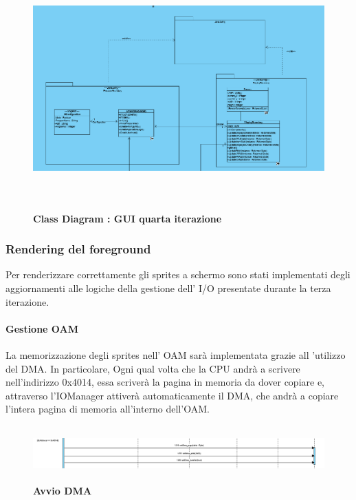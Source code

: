 \documentclass[11pt]{article}
\begin{document}
\begin{figure}[h]
\hspace*{-2.7cm}
\centering
\includegraphics[width=500px, height=350px]{CD_GUI_4.png}\\
\small\textbf{Class Diagram : GUI quarta iterazione}
\end{figure}

\subsubsection{Rendering del foreground}

Per renderizzare correttamente gli sprites a schermo sono stati implementati degli aggiornamenti alle logiche della gestione dell' I/O presentate durante la terza iterazione. 
\paragraph{Gestione OAM}
La memorizzazione degli sprites nell' OAM sarà implementata grazie all 'utilizzo del DMA. In particolare, Ogni qual volta che la CPU andrà a scrivere nell'indirizzo 0x4014, essa scriverà la pagina in memoria da dover copiare e, attraverso l'IOManager attiverà automaticamente il DMA, che andrà a copiare l'intera pagina di memoria all'interno dell'OAM.
\begin{figure}[h]
\hspace*{-4.2cm}
\centering
\includegraphics[width=600px, height=80px]{Scrittura_DMA.png}\\
\small\textbf{Avvio DMA}
\end{figure}\\
\end{document}
